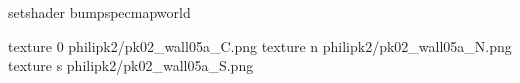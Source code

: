 setshader bumpspecmapworld

texture 0 philipk2/pk02_wall05a_C.png
texture n philipk2/pk02_wall05a_N.png
texture s philipk2/pk02_wall05a_S.png

